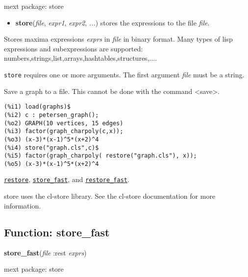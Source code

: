 \documentclass[]{article}
\begin{document}
\noindent mext package: store



\vspace{5 pt}
\begin{itemize}
\item[] {\bf store}({\it file}, {\it expr1}, {\it expr2}, {\it ...})
  stores the expressions to the file {\it file}. 

\end{itemize}
Stores maxima expressions {\it exprs} in {\it file} in binary format. Many types of lisp expressions and subexpressions are supported: numbers,strings,list,arrays,hashtables,structures,.... 

\vspace{5 pt}

   {\tt store} requires one or more arguments. The first argument {\it file} must be a string.


\vspace{5 pt}


   Save a graph to a file. This cannot be done with the command <save>. 

\begin{Verbatim}[frame=single]
(%i1) load(graphs)$
(%i2) c : petersen_graph();
(%o2) GRAPH(10 vertices, 15 edges)
(%i3) factor(graph_charpoly(c,x));
(%o3) (x-3)*(x-1)^5*(x+2)^4
(%i4) store("graph.cls",c)$
(%i5) factor(graph_charpoly( restore("graph.cls"), x));
(%o5) (x-3)*(x-1)^5*(x+2)^4
\end{Verbatim}


  \hyperlink{restore}{{\tt restore}}, \hyperlink{store_fast}{{\tt store\_fast}}, and \hyperlink{restore_fast}{{\tt restore\_fast}}.

\vspace{5 pt}


store uses the cl-store library. See the cl-store documentation for more information. 

\vspace{5 pt}


\subsection{Function: store\_fast\label{sec:store_fast}}
\hypertarget{store_fast}{}
{\bf store\_fast}({\it file} :rest {\it exprs})


\noindent mext package: store
\end{document}
